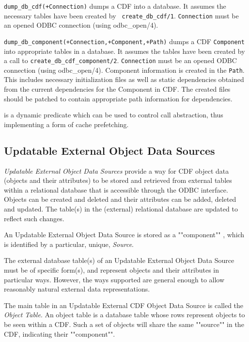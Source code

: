 \begin{description}
{\tt dump\_db\_cdf(+Connection)} dumps a CDF into a database. It
assumes the necessary tables have been created by {\tt
create\_db\_cdf/1}. {\tt Connection} must be an opened ODBC connection
(using odbc\_open/4).

{\tt dump\_db\_component(+Connection,+Component,+Path)} dumps a CDF
{\tt Component} into appropriate tables in a database. It assumes the
tables have been created by a call to
{\tt create\_db\_cdf\_component/2}. {\tt Connection} must be an opened ODBC
connection (using odbc\_open/4). Component information is created in
the {\tt Path}. This includes necessary initialization files as well as
static dependencies obtained from the current dependencies for the
Component in CDF. The created files should be patched to contain
appropriate path information for dependencies.

 is a dynamic predicate
which can be used to control call abstraction, thus implementing
a form of cache prefetching.

\end{description}


\subsection{Updatable External Object Data Sources}

{\em Updatable External Object Data Sources} provide a way for CDF object
data (objects and their attributes) to be stored and retrieved from
external tables within a relational database that is accessible
through the ODBC interface.  Objects can be created and deleted and
their attributes can be added, deleted and updated.  The table(s) in
the (external) relational database are updated to reflect such
changes.

An Updatable External Object Data Source is stored as a ""component""
, which is identified by a particular,
unique, {\em Source}.

The external database table(s) of an Updatable External Object Data
Source must be of specific form(s), and represent objects and their
attributes in particular ways.  However, the ways supported are
general enough to allow reasonably natural external data
representations.

The main table in an Updatable External CDF Object Data Source is
called the {\em Object Table}.  An object table is a database table
whose rows represent objects to be seen within a CDF.  Such a set of
objects will share the same ""source"" in the CDF, indicating their
""component"".

